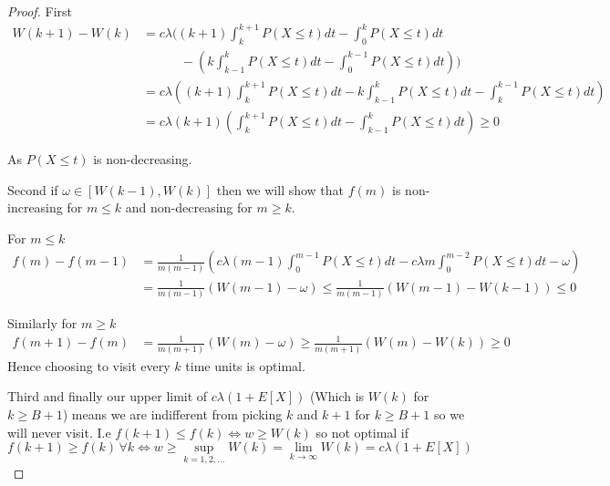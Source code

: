 \documentclass[a4paper,10pt]{article}
\theoremstyle{definition}
\theoremstyle{definition}
\theoremstyle{remark}
\theoremstyle{definition}
\begin{document}
\begin{proof}
First
\begin{align*}
W(k+1)-W(k)&= c \lambda ((k+1) \int_{k}^{k+1} P(X \leq t)dt - \int_{0}^{k} P(X \leq t)dt \\ & \quad \quad \quad -(k \int_{k-1}^{k} P(X \leq t)dt - \int_{0}^{k-1} P(X \leq t)dt)) \\ &=c \lambda ((k+1) \int_{k}^{k+1} P(X \leq t)dt -k \int_{k-1}^{k} P(X \leq t)dt - \int_{k}^{k-1} P(X \leq t)dt)\\ &=c \lambda (k+1) (\int_{k}^{k+1} P(X \leq t)dt - \int_{k-1}^{k} P(X \leq t)dt) \geq 0
\end{align*}

As $P(X \leq t)$ is non-decreasing.

Second if $\omega \in [W(k-1),W(k)]$ then we will show that $f(m)$ is non-increasing for $m \leq k$ and non-decreasing for $m \geq k$.

For $m \leq k$
\begin{align*}
f(m)-f(m-1)&=\frac{1}{m(m-1)}(c \lambda (m-1) \int_{0}^{m-1} P(X \leq t) dt - c \lambda m \int_{0}^{m-2} P(X \leq t) dt - \omega) \\
&=\frac{1}{m(m-1)}(W(m-1)-\omega) \leq \frac{1}{m(m-1)} (W(m-1)-W(k-1)) \leq 0
\end{align*}

Similarly for $m \geq k$
\begin{align*}
f(m+1)-f(m)&= \frac{1}{m(m+1)} (W(m)-\omega) \geq \frac{1}{m(m+1)} (W(m)-W(k)) \geq 0
\end{align*}
Hence choosing to visit every $k$ time units is optimal.

Third and finally our upper limit of $c \lambda (1+E[X])$ (Which is $W(k)$ for $k \geq B+1$) means we are indifferent from picking $k$ and $k+1$ for $k \geq B+1$ so we will never visit. I.e
$f(k+1) \leq f(k) \iff w \geq W(k)$ so not optimal if $f(k+1) \geq f(k) \, \forall k \iff w \geq \sup\limits_{k=1,2,...} W(k)=\lim\limits_{k \rightarrow \infty} W(k)=c \lambda (1+E[X])$
\end{proof}
\end{document}
